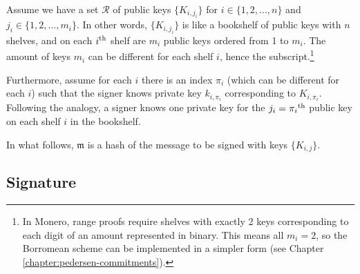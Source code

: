 Assume we have a set $\mathcal{R}$ of public keys $\{K_{i,j_i}\}$ for $i \in \{1,2,...,n\}$ and $j_i \in \{1, 2, ..., m_i\}$. In other words, $\{K_{i,j_i}\}$ is like a bookshelf of public keys with $n$ shelves, and on each $i\textsuperscript{th}$ shelf are $m_i$ public keys ordered from 1 to $m_i$. The amount of keys $m_i$ can be different for each shelf $i$, hence the subscript.\footnote{In Monero, range proofs require shelves with exactly 2 keys corresponding to each digit of an amount represented in binary. This means all $m_i = 2$, so the Borromean scheme can be implemented in a simpler form (see Chapter \ref{chapter:pedersen-commitments}).}

Furthermore, assume for each $i$ there is an index $\pi_i$ (which can be different for each $i$) such that the signer knows private key $k_{i,\pi_i}$ corresponding to $K_{i,\pi_i}$. Following the analogy, a signer knows one private key for the $j_i = \pi_i\textsuperscript{th}$ public key on each shelf $i$ in the bookshelf.

In what follows, \(\mathfrak{m}\) is a hash of the message to be signed with keys \(\{ K_{i,j} \} \).

\subsection*{Signature}


